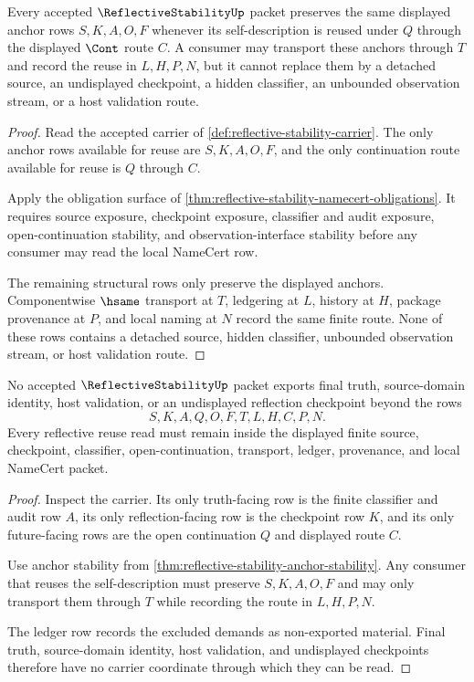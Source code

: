 \begin{theorem}
\label{thm:reflective-stability-anchor-stability}
Every accepted $\ReflectiveStabilityUp$ packet preserves the same displayed anchor rows $S,K,A,O,F$ whenever its self-description is reused under $Q$ through the displayed $\Cont$ route $C$. A consumer may transport these anchors through $T$ and record the reuse in $L,H,P,N$, but it cannot replace them by a detached source, an undisplayed checkpoint, a hidden classifier, an unbounded observation stream, or a host validation route.
\end{theorem}
\begin{proof}
Read the accepted carrier of \autoref{def:reflective-stability-carrier}. The only anchor rows available for reuse are $S,K,A,O,F$, and the only continuation route available for reuse is $Q$ through $C$.

Apply the obligation surface of \autoref{thm:reflective-stability-namecert-obligations}. It requires source exposure, checkpoint exposure, classifier and audit exposure, open-continuation stability, and observation-interface stability before any consumer may read the local NameCert row.

The remaining structural rows only preserve the displayed anchors. Componentwise $\hsame$ transport at $T$, ledgering at $L$, history at $H$, package provenance at $P$, and local naming at $N$ record the same finite route. None of these rows contains a detached source, hidden classifier, unbounded observation stream, or host validation route.
\end{proof}

\begin{theorem}
\label{thm:reflective-stability-nonescape}
No accepted $\ReflectiveStabilityUp$ packet exports final truth, source-domain identity, host validation, or an undisplayed reflection checkpoint beyond the rows
$$
S,K,A,Q,O,F,T,L,H,C,P,N.
$$
Every reflective reuse read must remain inside the displayed finite source, checkpoint, classifier, open-continuation, transport, ledger, provenance, and local NameCert packet.
\end{theorem}
\begin{proof}
Inspect the carrier. Its only truth-facing row is the finite classifier and audit row $A$, its only reflection-facing row is the checkpoint row $K$, and its only future-facing rows are the open continuation $Q$ and displayed route $C$.

Use anchor stability from \autoref{thm:reflective-stability-anchor-stability}. Any consumer that reuses the self-description must preserve $S,K,A,O,F$ and may only transport them through $T$ while recording the route in $L,H,P,N$.

The ledger row records the excluded demands as non-exported material. Final truth, source-domain identity, host validation, and undisplayed checkpoints therefore have no carrier coordinate through which they can be read.
\end{proof}

